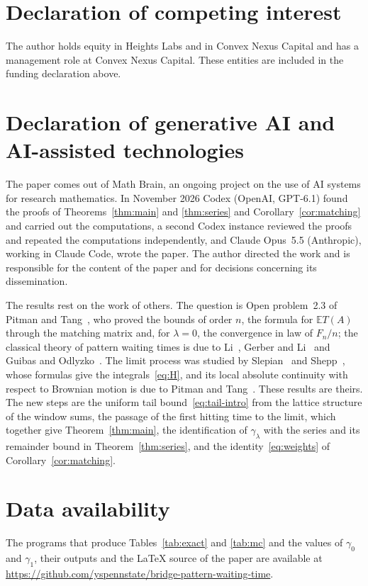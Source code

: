 \documentclass[11pt]{amsart}
\theoremstyle{remark}
\numberwithin{equation}{section}
\newcommand{\EE}{\mathbb{E}}
\begin{document}
\section*{Declaration of competing interest}
The author holds equity in Heights Labs and in Convex Nexus Capital and
has a management role at Convex Nexus Capital. These entities are included
in the funding declaration above.

\section*{Declaration of generative AI and AI-assisted technologies}
The paper comes out of Math Brain, an ongoing project on the use of AI systems for research mathematics. In November 2026 Codex (OpenAI, GPT-6.1) found the proofs of Theorems~\ref{thm:main} and \ref{thm:series} and Corollary~\ref{cor:matching} and carried out the computations, a second Codex instance reviewed the proofs and repeated the computations independently, and Claude Opus~5.5 (Anthropic), working in Claude Code, wrote the paper. The author directed the work and is responsible for the content of the paper and for decisions concerning its dissemination.

The results rest on the work of others. The question is Open problem~2.3 of Pitman and Tang~\cite{PT}, who proved the bounds of order $n$, the formula for $\EE T(A)$ through the matching matrix and, for $\lambda=0$, the convergence in law of $F_n/n$; the classical theory of pattern waiting times is due to Li~\cite{Li}, Gerber and Li~\cite{GL} and Guibas and Odlyzko~\cite{GO}. The limit process was studied by Slepian~\cite{Slepian} and Shepp~\cite{Shepp}, whose formulas give the integrals~\eqref{eq:H}, and its local absolute continuity with respect to Brownian motion is due to Pitman and Tang~\cite{PTS}. These results are theirs. The new steps are the uniform tail bound~\eqref{eq:tail-intro} from the lattice structure of the window sums, the passage of the first hitting time to the limit, which together give Theorem~\ref{thm:main}, the identification of $\gamma_\lambda$ with the series and its remainder bound in Theorem~\ref{thm:series}, and the identity~\eqref{eq:weights} of Corollary~\ref{cor:matching}.

\section*{Data availability}
The programs that produce Tables~\ref{tab:exact} and \ref{tab:mc} and the values of $\gamma_0$ and $\gamma_1$, their outputs and the \LaTeX{} source of the paper are available at \url{https://github.com/yspennstate/bridge-pattern-waiting-time}.
\end{document}
